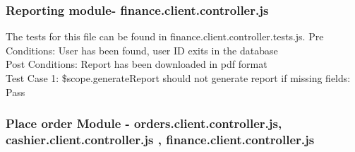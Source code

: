 \documentclass[a4paper,12pt]{report}
\begin{document}
\subsubsection{ Reporting module- finance.client.controller.js}
The tests for this file can be found in finance.client.controller.tests.js.
Pre Conditions: User has been found, user ID exits in the database \\
Post Conditions: Report has been downloaded in pdf format\\
Test Case 1: \$scope.generateReport should not generate report if missing fields: Pass \\

\subsubsection{Place order Module - orders.client.controller.js, cashier.client.controller.js , finance.client.controller.js}
\end{document}
